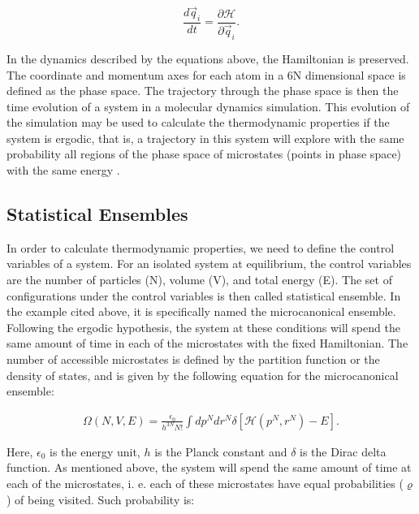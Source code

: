 \begin{equation}
\frac{d \vec{q}_{i}}{dt} =  \frac{\partial \mathcal{H}}{\partial \vec{q}_{i}}.
\end{equation}

In the dynamics described by the equations above, the Hamiltonian is preserved. The coordinate and momentum axes for each atom in a 6N dimensional space is defined as the phase space. The trajectory through the phase space is then the time evolution of a system in a molecular dynamics simulation. This evolution of the simulation may be used to calculate the thermodynamic properties if the system is ergodic, that is, a trajectory in this system will explore with the same probability all regions of the phase space of microstates (points in phase space) with the same energy \cite{shell2015}. 

\subsection{Statistical Ensembles}

In order to calculate thermodynamic properties, we need to define the control variables of a system. For an isolated system at equilibrium, the control variables are the number of particles (N), volume (V), and total energy (E). The set of configurations under the control variables is then called statistical ensemble. In the example cited above, it is specifically named the microcanonical ensemble. Following the ergodic hypothesis, the system at these conditions will spend the same amount of time in each of the microstates  with the fixed Hamiltonian.  The number of accessible microstates is defined by the partition function or the density of states, and  is given by the following equation  for the microcanonical ensemble: 

\begin{equation}
\begin{aligned}
\Omega (N,V,E) = \frac{\epsilon_{0}}{h^{3N}N!} \int dp^{N} dr^{N} \delta [\mathcal{H}(p^{N},r^{N}) -E].
\end{aligned}
\end{equation}

Here, $\epsilon _{0}$ is the energy unit, $h$ is the Planck constant and $\delta$ is the Dirac delta function. As mentioned above, the system will spend the same amount of time at each of the microstates, i. e. each of these microstates have equal probabilities ($\varrho$) of being visited. Such probability is:

